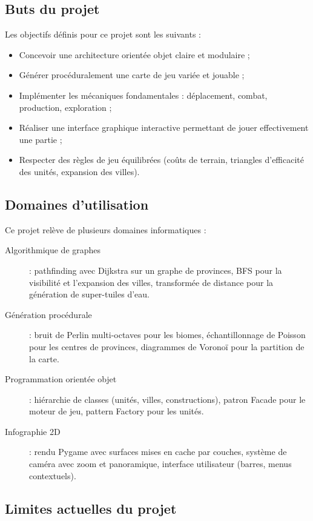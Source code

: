 \documentclass[12pt, a4paper]{article}
\begin{document}
\subsection{Buts du projet}

Les objectifs définis pour ce projet sont les suivants :
\begin{itemize}
    \item Concevoir une architecture orientée objet claire et modulaire ;
    \item Générer procéduralement une carte de jeu variée et jouable ;
    \item Implémenter les mécaniques fondamentales : déplacement, combat, production, exploration ;
    \item Réaliser une interface graphique interactive permettant de jouer effectivement une
    partie ;
    \item Respecter des règles de jeu équilibrées (coûts de terrain, triangles d'efficacité
    des unités, expansion des villes).
\end{itemize}

\subsection{Domaines d'utilisation}

Ce projet relève de plusieurs domaines informatiques :

\begin{description}
    \item[Algorithmique de graphes] : pathfinding avec Dijkstra sur un graphe de provinces,
    BFS pour la visibilité et l'expansion des villes, transformée de distance pour la
    génération de super-tuiles d'eau.
    \item[Génération procédurale] : bruit de Perlin multi-octaves pour les biomes, échantillonnage
    de Poisson pour les centres de provinces, diagrammes de Voronoï pour la partition de la carte.
    \item[Programmation orientée objet] : hiérarchie de classes (unités, villes, constructions),
    patron Facade pour le moteur de jeu, pattern Factory pour les unités.
    \item[Infographie 2D] : rendu Pygame avec surfaces mises en cache par couches, système de
    caméra avec zoom et panoramique, interface utilisateur (barres, menus contextuels).
\end{description}

\subsection{Limites actuelles du projet}
\end{document}
